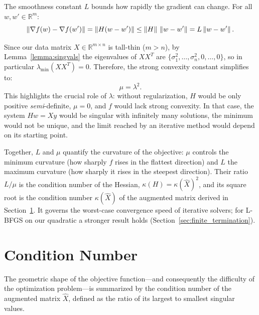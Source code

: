 \noindent The smoothness constant $L$ bounds how rapidly the gradient can change.
For all $w, w' \in \mathbb{R}^m$:
\begin{equation}
    \left\|\nabla f(w) - \nabla f(w')\right\| = \left\|H(w - w')\right\| \leq \left\|H\right\|\,\left\|w - w'\right\| = L\left\|w - w'\right\|.
\end{equation}

\noindent Since our data matrix $X \in \mathbb{R}^{m \times n}$ is tall-thin
($m > n$), by Lemma~\ref{lemma:singvals} the eigenvalues of $XX^T$ are
$\{\sigma_1^2, \ldots, \sigma_n^2, 0, \ldots, 0\}$, so in particular
$\lambda_{\min}(XX^T) = 0$. Therefore, the strong convexity constant simplifies
to:
\begin{equation}
    \mu = \lambda^2.
\end{equation}
This highlights the crucial role of $\lambda$: without regularization, $H$ would
be only positive \emph{semi}-definite, $\mu = 0$, and $f$ would lack strong
convexity. In that case, the system $Hw = Xy$ would be singular with infinitely many
solutions, the minimum would not be unique, and the limit reached by an
iterative method would depend on its starting point.

\noindent Together, $L$ and $\mu$ quantify the curvature of the objective: $\mu$
controls the minimum curvature (how sharply $f$ rises in the flattest direction)
and $L$ the maximum curvature (how sharply it rises in the steepest direction).
Their ratio $L/\mu$ is the condition number of the Hessian,
$\kappa(H) = \kappa(\hat X)^2$, and its square root is the condition number
$\kappa(\hat X)$ of the augmented matrix derived in
Section~\ref{sec:conditioning}. It governs the worst-case convergence speed of
iterative solvers; for L-BFGS on our quadratic a stronger result holds
(Section~\ref{sec:finite_termination}).


\section{Condition Number}
\label{sec:conditioning}

\noindent The geometric shape of the objective function---and consequently the
difficulty of the optimization problem---is summarized by the condition number of
the augmented matrix $\hat{X}$, defined as the ratio of its largest to smallest
singular values.

